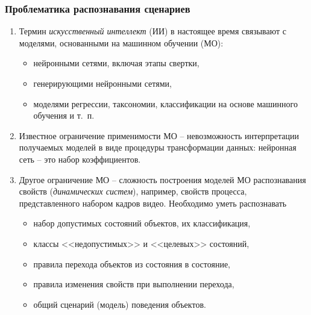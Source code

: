 \documentclass[10pt]{beamer}
\begin{document}
\begin{frame}
  \frametitle{Проблематика распознавания сценариев}
  \begin{enumerate}
  \item Термин \emph{искусственный интеллект} (ИИ) в настоящее время связывают с моделями, основанными на машинном обучении (МО):
    \begin{itemize}
    \item нейронными сетями, включая этапы свертки,
    \item генерирующими нейронными сетями,
    \item моделями регрессии, таксономии, классификации на основе машинного обучения и т.~п.
    \end{itemize}
  \item Известное ограничение применимости МО -- невозможность интерпретации получаемых моделей в виде процедуры трансформации данных: нейронная сеть -- это набор коэффициентов.
  \item Другое ограничение МО -- сложность построения моделей МО распознавания свойств (\emph{динамических систем}), например, свойств процесса, представленного набором кадров видео. Необходимо уметь распознавать
    \begin{itemize}
    \item набор допустимых состояний объектов, их классификация,
    \item классы <<недопустимых>> и <<целевых>> состояний,
    \item правила перехода объектов из состояния в состояние,
    \item правила изменения свойств при выполнении перехода,
    \item общий сценарий (модель) поведения объектов.
    \end{itemize}
  \end{enumerate}
\end{frame}
\end{document}
